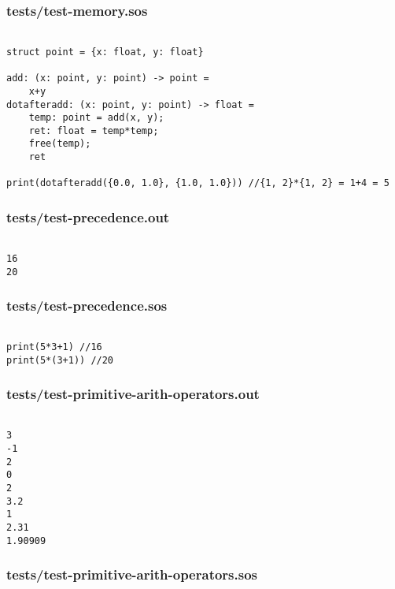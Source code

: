 \documentclass[main.tex]{subfiles}
\begin{document}
\subsubsection{tests/test-memory.sos}

\begin{lstlisting}

struct point = {x: float, y: float}

add: (x: point, y: point) -> point = 
    x+y
dotafteradd: (x: point, y: point) -> float =
    temp: point = add(x, y);
    ret: float = temp*temp;
    free(temp);
    ret

print(dotafteradd({0.0, 1.0}, {1.0, 1.0})) //{1, 2}*{1, 2} = 1+4 = 5
\end{lstlisting}

\subsubsection{tests/test-precedence.out}

\begin{lstlisting}

16
20
\end{lstlisting}

\subsubsection{tests/test-precedence.sos}

\begin{lstlisting}

print(5*3+1) //16
print(5*(3+1)) //20
\end{lstlisting}

\subsubsection{tests/test-primitive-arith-operators.out}

\begin{lstlisting}

3
-1
2
0
2
3.2
1
2.31
1.90909
\end{lstlisting}

\subsubsection{tests/test-primitive-arith-operators.sos}
\end{document}
